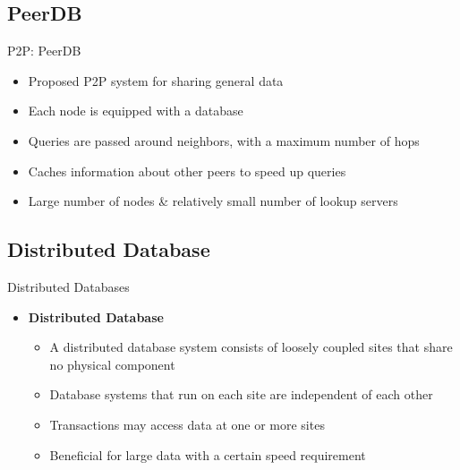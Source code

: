 \documentclass{beamer}
\begin{document}
    
    \subsection{PeerDB}
    \begin{frame}{P2P: PeerDB}
        \begin{itemize}
            \item Proposed P2P system for sharing general data
            \item Each node is equipped with a database
            \item Queries are passed around neighbors, with a maximum number of hops
            \item Caches information about other peers to speed up queries
            \item Large number of nodes \& relatively small number of lookup servers
            \cite{peerdb}
        \end{itemize}
    \end{frame}
    
    \subsection{Distributed Database}
    \begin{frame}{Distributed Databases}
        \begin{itemize}
            \item \textbf{Distributed Database}
            \begin{itemize}
                \item A distributed database system consists of loosely coupled sites that share no physical component             
                \item Database systems that run on each site are independent of each other
                \item Transactions may access data at one or more sites
                \cite[Ch.~19]{Silberschatz2010}
                \item Beneficial for large data with a certain speed requirement
            \end{itemize}
        \end{itemize}
    \end{frame}

        
\end{document}
